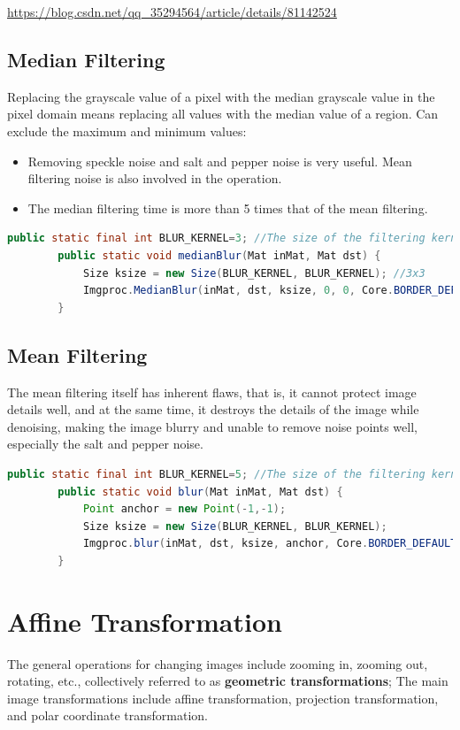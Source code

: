 \documentclass{article}
\begin{document}
	\url{https://blog.csdn.net/qq_35294564/article/details/81142524}
	
	\subsection{Median Filtering}
	Replacing the grayscale value of a pixel with the median grayscale value in the pixel domain means replacing all values with the median value of a region. Can exclude the maximum and minimum values:
	\begin{itemize}
		\item Removing speckle noise and salt and pepper noise is very useful. Mean filtering noise is also involved in the operation.
		\item The median filtering time is more than 5 times that of the mean filtering.
	\end{itemize}
	\begin{lstlisting}[language=Java]
		public static final int BLUR_KERNEL=3; //The size of the filtering kernel must be a positive odd number
		public static void medianBlur(Mat inMat, Mat dst) {
			Size ksize = new Size(BLUR_KERNEL, BLUR_KERNEL); //3x3
			Imgproc.MedianBlur(inMat, dst, ksize, 0, 0, Core.BORDER_DEFAULT);
		}
	\end{lstlisting}
	
	\subsection{Mean Filtering}
	The mean filtering itself has inherent flaws, that is, it cannot protect image details well, and at the same time, it destroys the details of the image while denoising, making the image blurry and unable to remove noise points well, especially the salt and pepper noise.
	\begin{lstlisting}[language=Java]
		public static final int BLUR_KERNEL=5; //The size of the filtering kernel must be a positive odd number
		public static void blur(Mat inMat, Mat dst) {
			Point anchor = new Point(-1,-1);
			Size ksize = new Size(BLUR_KERNEL, BLUR_KERNEL);
			Imgproc.blur(inMat, dst, ksize, anchor, Core.BORDER_DEFAULT);
		}
	\end{lstlisting}
	
	\section{Affine Transformation}
	The general operations for changing images include zooming in, zooming out, rotating, etc., collectively referred to as \textbf{geometric transformations}; The main image transformations include affine transformation, projection transformation, and polar coordinate transformation.
	
\end{document}
